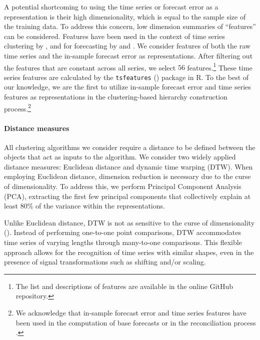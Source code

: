 \documentclass[a4paper,review,12pt,authoryear]{elsarticle}
\let\code=\texttt
\begin{document}
A potential shortcoming to using the time series or forecast error as a representation is their high dimensionality, which is equal to the sample size of the training data. To address this concern, low dimension summaries of ``features'' can be considered. Features have been used in the context { of}
time series clustering by \cite{tianoFeatTSFeaturebasedTime2021}, and for forecasting by \cite{wangUncertaintyEstimationFeaturebased2022} and \cite{ liFeaturebasedIntermittentDemand2023}. 
We consider features of both the raw time series and the in-sample forecast error as representations. After filtering out the features that are constant across all series, we select $56$ features.\footnote{The list and descriptions of features are available in the online GitHub repository.} These time series features are calculated by the \code{tsfeatures} (\citealp{tsfeatures}) package in R. 
{To the best of our knowledge, we are the first to utilize in-sample forecast error and time series features as representations in the clustering-based hierarchy construction process.\footnote{We acknowledge that in-sample forecast error and time series features have been used in the computation of base forecasts or in the reconciliation process \citep[see][]{wickramasuriyaOptimalForecastReconciliation2019}.}}

\paragraph{\textbf{Distance measures}}

All clustering algorithms we consider require a distance to be defined between the objects that act as inputs to the algorithm.
We consider two widely applied distance measures: Euclidean distance and dynamic time warping (DTW). When employing Euclidean distance, dimension reduction is necessary due to the curse of dimensionality.
To address this, we perform Principal Component Analysis (PCA), extracting the first few principal components that collectively explain at least 80\% of the variance within the representations.

Unlike Euclidean distance, DTW is not as sensitive to the curse of dimensionality (\citealp{sakoeDynamicProgrammingAlgorithm1978}). Instead of performing one-to-one point comparisons, DTW accommodates time series of varying lengths through many-to-one comparisons. This flexible approach allows for the recognition of time series with similar shapes, even in the presence of signal transformations such as shifting and/or scaling.
\end{document}
